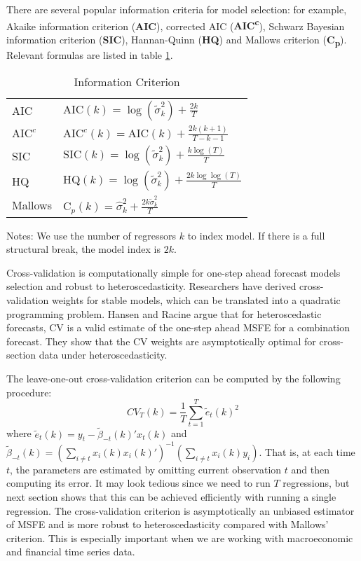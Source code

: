 There are several popular information criteria for model selection: for example, Akaike information criterion (\textbf{AIC}), corrected AIC (\textbf{AIC\textsuperscript{c}}), Schwarz Bayesian information criterion (\textbf{SIC}), Hannan-Quinn (\textbf{HQ}) and Mallows criterion (\textbf{C\textsubscript{p}}). Relevant formulas are listed in table \ref{tb:1}.
\begin{table}
\centering
\caption{Information Criterion} \label{tb:1}
\begin{threeparttable}
\begin{tabular}{ll}
\toprule
AIC                 & $\mathrm{AIC}(k) = \log{(\tilde{\sigma}^{2}_{k})} + \frac{2k}{T}$ \\[0.4em]
$\mathrm{AIC}^{c}$  & $\mathrm{AIC}^{c}(k) = \mathrm{AIC}(k) + \frac{2k(k+1)}{T-k-1}$ \\[0.4em]
SIC                 & $\mathrm{SIC}(k) = \log{(\tilde{\sigma}^{2}_{k})} + \frac{k\log{(T)}}{T}$ \\[0.4em]
HQ                  & $\mathrm{HQ}(k) = \log{(\tilde{\sigma}^{2}_{k})} + \frac{2k\log{\log(T)}}{T}$ \\[0.4em]
Mallows            & $\mathrm{C}_{p}(k) = \hat{\sigma}^{2}_{k} + \frac{2k\tilde{\sigma}^{2}_{k}}{T}$\\
\bottomrule
\end{tabular}
\begin{tablenotes} \footnotesize
Notes: We use the number of regressors $k$ to index model. If there is a full structural break, the model index is $2k$.
\end{tablenotes}
\end{threeparttable}
\end{table}

Cross-validation is computationally simple for one-step ahead forecast models selection and robust to heteroscedasticity. Researchers have derived cross-validation weights for stable models, which can be translated into a quadratic programming problem. Hansen and Racine \cite{hansen2011jackknife} argue that for heteroscedastic forecasts, CV is a valid estimate of the one-step ahead MSFE for a combination forecast. They show that the CV weights are asymptotically optimal for cross-section data under heteroscedasticity.

The leave-one-out cross-validation criterion can be computed by the following procedure:
\begin{equation}
	CV_T(k) = \frac{1}{T}\sum_{t=1}^{T}\tilde{e}_{t}(k)^{2}
\end{equation}
where $\tilde{e}_{t}(k) = y_t - \tilde{\beta}_{-t}(k)'x_t(k)$ and $\tilde{\beta}_{-t}(k) = (\sum_{i\not= t}x_i(k) x_i(k)')^{-1}(\sum_{i\not= t}x_i(k) y_i)$. That is, at each time $t$, the parameters are estimated by omitting current observation $t$ and then computing its error. It may look tedious since we need to run $T$ regressions, but next section shows that this can be achieved efficiently with running a single regression. The cross-validation criterion is asymptotically an unbiased estimator of MSFE and is more robust to heteroscedasticity compared with Mallows' criterion. This is especially important when we are working with macroeconomic and financial time series data.

